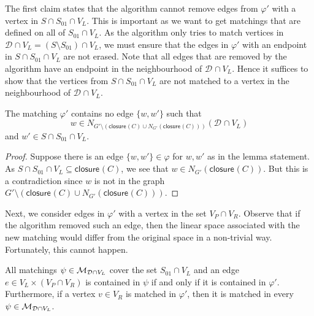 \documentclass{article}
\newcommand{\set}[1]{\{ #1 \}}
\newcommand{\neigh}[2][]{N_{{#1}}(#2)}
\newcommand{\V}[1][]{V_{#1}}
\newcommand{\Vl}{\V[L]}
\newcommand{\Vr}{\V[R]}
\newcommand{\Vp}{\V[P]}
\newcommand{\Gprime}{G'}
\newcommand{\closure}[2][]{\mathsf{closure}_{{#1}}(#2)}
\newcommand{\diffclosure}[1][]{D_{{#1}}}
\renewcommand{\diffclosure}[1][]{\mathcal{D}_{{#1}}}
\newcommand{\matcha}{\varphi}
\newcommand{\matchb}{\varphi'}
\newcommand{\matchc}{\psi}
\newcommand{\matchings}[1][]{\ensuremath \mathcal{M}_{{#1}}}
\numberwithin{equation}{section}
\begin{document}
The first claim states that the algorithm cannot remove edges from
$\matchb$ with 
a vertex in $S \cap S_{01} \cap \Vl$.
This is important as we want
to get matchings that are defined on all of $S_{01} \cap \Vl$.
As the algorithm only tries to match vertices in 
$\diffclosure \cap \Vl = (S \setminus S_{01}) \cap \Vl$,
we must ensure that the edges in $\matchb$ with an endpoint in
$S \cap S_{01} \cap \Vl$ are not erased.
Note that all edges that are removed by the algorithm have an endpoint in the
neighbourhood of $\diffclosure \cap \Vl$. Hence it suffices to show
that the vertices from $S \cap S_{01} \cap \Vl$ are not matched to
a vertex in the neighbourhood of $\diffclosure \cap \Vl$.

\begin{claim}\label{clm:neighbours}
  The matching $\matchb$ contains no edge $\set{w, w'}$ such that
  $$w \in \neigh[
  {\Gprime \setminus (\closure{C} \cup \neigh[\Gprime]{\closure{C}})}]
  {\diffclosure \cap \Vl}$$
  and
  $w' \in S \cap S_{01} \cap \Vl$.
\end{claim}

\begin{proof}
  Suppose there is an edge $\set{w, w'} \in \matcha$ for $w, w'$ as
  in the lemma statement. As 
  $S \cap S_{01} \cap \Vl\subseteq \closure{C}$, we see that 
  $w \in \neigh[\Gprime]{\closure{C}}$. 
  But this is a contradiction since $w$ is not in the graph
  $\Gprime \setminus (\closure{C} \cup \neigh[\Gprime]{\closure{C}})$. 
\end{proof}

Next, we consider edges in $\matchb$ with a vertex in the set $\Vp \cap \Vr$.
Observe that if the algorithm removed such an edge, then the linear
space associated with the new matching would differ from the original
space in a non-trivial way. Fortunately, this cannot happen. 

\begin{claim}\label{clm:dom_matchings}
  All matchings $\matchc \in \matchings[\diffclosure \cap \Vl]$ 
  cover the set
  $S_{01} \cap \Vl$
  and an edge $e \in \Vl \times (\Vp \cap \Vr)$ is contained in
  $\matchc$ if and only if it is contained in $\matchb$. Furthermore,
  if a vertex $v \in \Vr$ is matched in $\matchb$, then it is matched
  in every $\matchc \in \matchings[\diffclosure \cap \Vl]$.
\end{claim}
\end{document}
